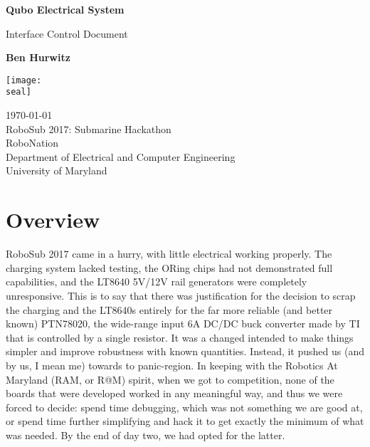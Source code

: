 \documentclass{article}
\newcommand{\assignmentType}{Interface Control Document}
\newcommand{\assignmentTitle}{Qubo Electrical System}
\newcommand{\courseNum}{RoboSub 2017}
\newcommand{\courseTitle}{Submarine Hackathon}
\newcommand{\prof}{RoboNation}
\newcommand{\dept}{Department of Electrical and Computer Engineering}
\newcommand{\univ}{University of Maryland}
\newcommand{\seal}{UMD_seal.png}
\newcommand{\student}{Ben Hurwitz}
\begin{document}

\begin{titlepage}
    \begin{center}
        \vspace*{1cm}
        
        \Huge
        \textbf{\assignmentTitle}
        
        \vspace{0.5cm}
        \LARGE
        \assignmentType
        
        \vspace{1.5cm}
        
        \textbf{\student}
        
        \vfill
        
        \vspace{0.6cm}
        
        \texttt{[image: \\seal]}
        
        \vfill
        
        \Large
        \today	\\
        \courseNum : \courseTitle \\
        \prof \\
        \dept \\
        \univ \\
        
    \end{center}
\end{titlepage}

\tableofcontents
\listoffigures
\listoftables

\pagebreak

\section{Overview}
RoboSub 2017 came in a hurry, with little electrical working properly. The charging system lacked testing, the ORing chips had not demonstrated full capabilities, and the LT8640 5V/12V rail generators were completely unresponsive. This is to say that there was justification for the decision to scrap the charging and the LT8640s entirely for the far more reliable (and better known) PTN78020, the wide-range input 6A DC/DC buck converter made by TI that is controlled by a single resistor. It was a changed intended to make things simpler and improve robustness with known quantities. Instead, it pushed us (and by us, I mean me) towards to panic-region. In keeping with the Robotics At Maryland (RAM, or R@M) spirit, when we got to competition, none of the boards that were developed worked in any meaningful way, and thus we were forced to decide: spend time debugging, which was not something we are good at, or spend time further simplifying and hack it to get exactly the minimum of what was needed. By the end of day two, we had opted for the latter.
\end{document}
